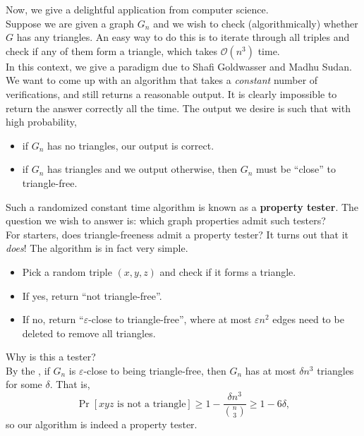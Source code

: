 			Now, we give a delightful application from computer science.\\
			Suppose we are given a graph $G_n$ and we wish to check (algorithmically) whether $G$ has any triangles. An easy way to do this is to iterate through all triples and check if any of them form a triangle, which takes $\mathcal{O}(n^3)$ time.\\
			In this context, we give a paradigm due to Shafi Goldwasser and Madhu Sudan. We want to come up with an algorithm that takes a \emph{constant} number of verifications, and still returns a reasonable output. It is clearly impossible to return the answer correctly all the time. The output we desire is such that with high probability,
			\begin{itemize}
				\item if $G_n$ has no triangles, our output is correct.
				\item if $G_n$ has triangles and we output otherwise, then $G_n$ must be ``close'' to triangle-free.
			\end{itemize}
			Such a randomized constant time algorithm is known as a \textbf{property tester}. The question we wish to answer is: which graph properties admit such testers?\\
			For starters, does triangle-freeness admit a property tester? It turns out that it \emph{does}! The algorithm is in fact very simple.

			\begin{itemize}
				\item Pick a random triple $(x,y,z)$ and check if it forms a triangle.
				\item If yes, return ``not triangle-free''.
				\item If no, return ``$\varepsilon$-close to triangle-free'', where at most $\varepsilon n^2$ edges need to be deleted to remove all triangles.
			\end{itemize}

			Why is this a tester?\\
			By the , if $G_n$ is $\varepsilon$-close to being triangle-free, then $G_n$ has at most $\delta n^3$ triangles for some $\delta$. That is,
			\[ \Pr[xyz \text{ is not a triangle}] \ge 1 - \frac{\delta n^3}{\binom{n}{3}} \ge 1 - 6\delta, \]
			so our algorithm is indeed a property tester.
